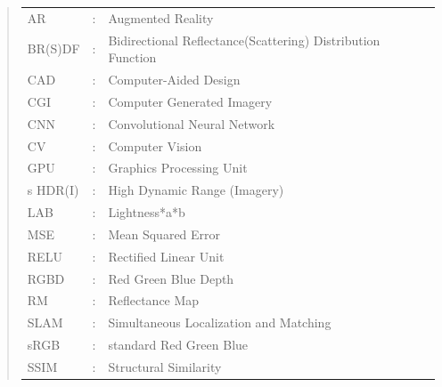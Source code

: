 \documentclass[ %
                    author={Gavin Parker},
                supervisor={Dr. Neill Campbell},
                    degree={MEng},
                     title={Deep Siamese Networks for Illumination Estimation from Stereo Images},
                  subtitle={},
                      type={Research},
                      year={2018} ]{dissertation}
\begin{document}
\begin{quote}
\noindent
\begin{tabular}{lcl}
AR                 &:     & Augmented Reality                                           \\
BR(S)DF        &:    & Bidirectional Reflectance(Scattering) Distribution Function \\
CAD         &:  & Computer-Aided Design \\
CGI         &:  & Computer Generated Imagery \\
CNN                 &:     & Convolutional Neural Network                               \\
CV          &:  & Computer Vision \\
GPU         &:   & Graphics Processing Unit \\s
HDR(I)          &:    & High Dynamic Range (Imagery)                    \\
LAB         &:  & Lightness*a*b \\
MSE         &:  & Mean Squared Error \\
RELU         &:   & Rectified Linear Unit \\
RGBD         &:  & Red Green Blue Depth \\
RM           &:   & Reflectance Map \\
SLAM        &:  & Simultaneous Localization and Matching \\
sRGB        &:    & standard Red Green Blue                  \\
SSIM        &:    & Structural Similarity                    \\
\end{tabular}
\end{quote}


\noindent


%
\end{document}
